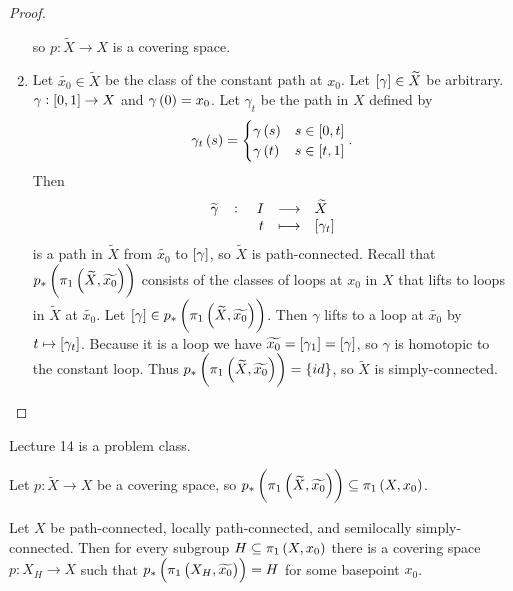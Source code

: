 \begin{proof}
\begin{enumerate}
so $ p : \widetilde{X} \to X $ is a covering space.
\item Let $ \widetilde{x_0} \in \widetilde{X} $ be the class of the constant path at $ x_0 $. Let $ \sbr{\gamma} \in \widetilde{X} $ be arbitrary. $ \gamma : \sbr{0, 1} \to X $ and $ \gamma\br{0} = x_0 $. Let $ \gamma_t $ be the path in $ X $ defined by
$$ \gamma_t\br{s} =
\begin{cases}
\gamma\br{s} & s \in \sbr{0, t} \\
\gamma\br{t} & s \in \sbr{t, 1}
\end{cases}.
$$
Then
$$ \function[\widetilde{\gamma}]{I}{\widetilde{X}}{t}{\sbr{\gamma_t}} $$
is a path in $ \widetilde{X} $ from $ \widetilde{x_0} $ to $ \sbr{\gamma} $, so $ \widetilde{X} $ is path-connected. Recall that $ p_*\br{\pi_1\br{\widetilde{X}, \widetilde{x_0}}} $ consists of the classes of loops at $ x_0 $ in $ X $ that lifts to loops in $ \widetilde{X} $ at $ \widetilde{x_0} $. Let $ \sbr{\gamma} \in p_*\br{\pi_1\br{\widetilde{X}, \widetilde{x_0}}} $. Then $ \gamma $ lifts to a loop at $ \widetilde{x_0} $ by $ t \mapsto \sbr{\gamma_t} $. Because it is a loop we have $ \widetilde{x_0} = \sbr{\gamma_1} = \sbr{\gamma} $, so $ \gamma $ is homotopic to the constant loop. Thus $ p_*\br{\pi_1\br{\widetilde{X}, \widetilde{x_0}}} = \cbr{id} $, so $ \widetilde{X} $ is simply-connected.
\end{enumerate}
\end{proof}


Lecture 14 is a problem class.


Let $ p : \widetilde{X} \to X $ be a covering space, so $ p_*\br{\pi_1\br{\widetilde{X}, \widetilde{x_0}}} \subseteq \pi_1\br{X, x_0} $.

\begin{proposition}
\label{prop:1.36}
Let $ X $ be path-connected, locally path-connected, and semilocally simply-connected. Then for every subgroup $ H \subseteq \pi_1\br{X, x_0} $ there is a covering space $ p : X_H \to X $ such that $ p_*\br{\pi_1\br{X_H, \widetilde{x_0}}} = H $ for some basepoint $ x_0 $.
\end{proposition}

